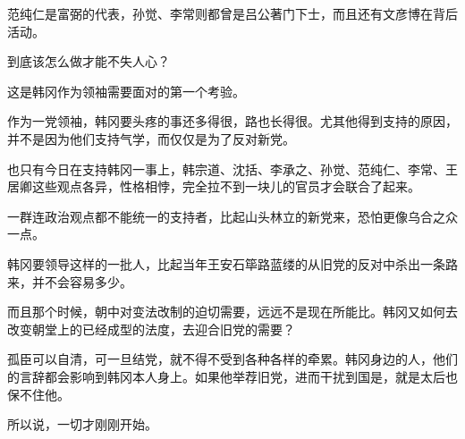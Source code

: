 范纯仁是富弼的代表，孙觉、李常则都曾是吕公著门下士，而且还有文彦博在背后活动。

到底该怎么做才能不失人心？

这是韩冈作为领袖需要面对的第一个考验。

作为一党领袖，韩冈要头疼的事还多得很，路也长得很。尤其他得到支持的原因，并不是因为他们支持气学，而仅仅是为了反对新党。

也只有今日在支持韩冈一事上，韩宗道、沈括、李承之、孙觉、范纯仁、李常、王居卿这些观点各异，性格相悖，完全拉不到一块儿的官员才会联合了起来。

一群连政治观点都不能统一的支持者，比起山头林立的新党来，恐怕更像乌合之众一点。

韩冈要领导这样的一批人，比起当年王安石筚路蓝缕的从旧党的反对中杀出一条路来，并不会容易多少。

而且那个时候，朝中对变法改制的迫切需要，远远不是现在所能比。韩冈又如何去改变朝堂上的已经成型的法度，去迎合旧党的需要？

孤臣可以自清，可一旦结党，就不得不受到各种各样的牵累。韩冈身边的人，他们的言辞都会影响到韩冈本人身上。如果他举荐旧党，进而干扰到国是，就是太后也保不住他。

所以说，一切才刚刚开始。

